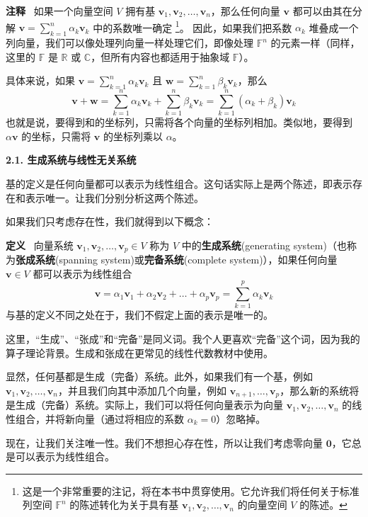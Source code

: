 \textbf{注释}~
如果一个向量空间 $V$ 拥有基 $\mathbf{v}_1, \mathbf{v}_2, \dots, \mathbf{v}_n$，那么任何向量 $\mathbf{v}$ 都可以由其在分解 $\mathbf{v} = \sum_{k=1}^n \alpha_k \mathbf{v}_k$ 中的系数唯一确定
\footnote{这是一个非常重要的注记，将在本书中贯穿使用。它允许我们将任何关于标准列空间 $\mathbb{F}^n$ 的陈述转化为关于具有基 $\mathbf{v}_1, \mathbf{v}_2, \dots, \mathbf{v}_n$ 的向量空间 $V$ 的陈述。}。
因此，如果我们把系数 $\alpha_k$ 堆叠成一个列向量，我们可以像处理列向量一样处理它们，即像处理 $\mathbb{F}^n$ 的元素一样（同样，这里的 $\mathbb{F}$ 是 $\mathbb{R}$ 或 $\mathbb{C}$，但所有内容也都适用于抽象域 $\mathbb{F}$）。

具体来说，如果 $\mathbf{v} = \sum_{k=1}^n \alpha_k \mathbf{v}_k$ 且 $\mathbf{w} = \sum_{k=1}^n \beta_k \mathbf{v}_k$，那么
$$ \mathbf{v} + \mathbf{w} = \sum_{k=1}^n \alpha_k \mathbf{v}_k + \sum_{k=1}^n \beta_k \mathbf{v}_k = \sum_{k=1}^n (\alpha_k + \beta_k) \mathbf{v}_k $$
也就是说，要得到和的坐标列，只需将各个向量的坐标列相加。类似地，要得到 $\alpha \mathbf{v}$ 的坐标，只需将 $\mathbf{v}$ 的坐标列乘以 $\alpha$。



\textbf{2.1. 生成系统与线性无关系统}

基的定义是任何向量都可以表示为线性组合。这句话实际上是两个陈述，即表示存在和表示唯一。让我们分别分析这两个陈述。

如果我们只考虑存在性，我们就得到以下概念：

\textbf{定义}~  向量系统 $\mathbf{v}_1, \mathbf{v}_2, \dots, \mathbf{v}_p \in V$ 称为 $V$ 中的\textbf{生成系统}(generating system)（也称为\textbf{张成系统}(spanning system)或\textbf{完备系统}(complete system)），如果任何向量 $\mathbf{v} \in V$ 都可以表示为线性组合
$$
\mathbf{v} = \alpha_1 \mathbf{v}_1 + \alpha_2 \mathbf{v}_2 + \dots + \alpha_p \mathbf{v}_p = \sum_{k=1}^p \alpha_k \mathbf{v}_k
$$
与基的定义不同之处在于，我们不假定上面的表示是唯一的。


这里，“生成”、“张成”和“完备”是同义词。我个人更喜欢“完备”这个词，因为我的算子理论背景。生成和张成在更常见的线性代数教材中使用。

显然，任何基都是生成（完备）系统。此外，如果我们有一个基，例如 $\mathbf{v}_1, \mathbf{v}_2, \dots, \mathbf{v}_n$，并且我们向其中添加几个向量，例如 $\mathbf{v}_{n+1}, \dots, \mathbf{v}_p$，那么新的系统将是生成（完备）系统。实际上，我们可以将任何向量表示为向量 $\mathbf{v}_1, \mathbf{v}_2, \dots, \mathbf{v}_n$ 的线性组合，并将新向量（通过将相应的系数 $\alpha_k = 0$）忽略掉。

现在，让我们关注唯一性。我们不想担心存在性，所以让我们考虑零向量 $\mathbf{0}$，它总是可以表示为线性组合。

